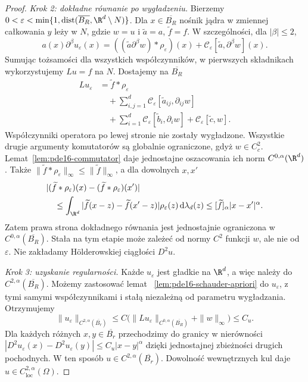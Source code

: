 \begin{proof}
\emph{Krok 2: dokładne równanie po wygładzeniu.}
Bierzemy $0<\varepsilon<\min\{1,
\operatorname{dist}(\overline{B_R},\R^d\setminus N)\}$.
Dla $x\in\overline{B_R}$ nośnik jądra w zmiennej
całkowania $y$ leży w $N$, gdzie $w=u$ i
$\widetilde a=a$, $\widetilde f=f$.
W szczególności, dla $|\beta|\le2$,
\[
 a(x)\partial^\beta u_\varepsilon(x)
 =((\widetilde a\partial^\beta w)*\rho_\varepsilon)(x)
    +\mathcal C_\varepsilon[\widetilde a,\partial^\beta w](x).
\]
Sumując tożsamości dla wszystkich współczynników,
w pierwszych składnikach wykorzystujemy $Lu=f$
na $N$. Dostajemy na $\overline{B_R}$
\[
 \begin{aligned}
 Lu_\varepsilon
 &=\widetilde f*\rho_\varepsilon\\
 &\quad+\sum_{i,j=1}^d
       \mathcal C_\varepsilon[\widetilde a_{ij},\partial_{ij}w]\\
 &\quad+\sum_{i=1}^d
       \mathcal C_\varepsilon[\widetilde b_i,\partial_i w]
       +\mathcal C_\varepsilon[\widetilde c,w].
 \end{aligned}
\]
Współczynniki operatora po lewej stronie
nie zostały wygładzone.
Wszystkie drugie argumenty komutatorów są globalnie
ograniczone, gdyż $w\in C_c^2$.
Lemat~\ref{lem:pde16-commutator} daje jednostajne
oszacowania ich norm $C^{0,\alpha}(\R^d)$.
Także $\|\widetilde f*\rho_\varepsilon\|_\infty
\le\|\widetilde f\|_\infty$, a dla dowolnych $x,x'$
\[
 \begin{aligned}
 &|(\widetilde f*\rho_\varepsilon)(x)
       -(\widetilde f*\rho_\varepsilon)(x')|\\
 &\quad\le\int_{\R^d}
 |\widetilde f(x-z)-\widetilde f(x'-z)|
 \rho_\varepsilon(z)\,\mathrm d\lambda_d(z)
 \le[\widetilde f]_\alpha|x-x'|^\alpha .
 \end{aligned}
\]
Zatem prawa strona dokładnego równania jest
jednostajnie ograniczona w $C^{0,\alpha}(\overline{B_R})$.
Stała na tym etapie może zależeć od normy $C^2$
funkcji $w$, ale nie od $\varepsilon$.
Nie zakładamy Hölderowskiej ciągłości $D^2u$.

\emph{Krok 3: uzyskanie regularności.}
Każde $u_\varepsilon$ jest gładkie na $\R^d$,
a więc należy do $C^{2,\alpha}(\overline{B_R})$.
Możemy zastosować lemat
~\ref{lem:pde16-schauder-apriori} do $u_\varepsilon$,
z tymi samymi współczynnikami i stałą niezależną
od parametru wygładzania. Otrzymujemy
\[
 \|u_\varepsilon\|_{C^{2,\alpha}(\overline{B_r})}
 \le C\bigl(\|Lu_\varepsilon\|_{C^{0,\alpha}(\overline{B_R})}
                  +\|w\|_\infty\bigr)\le C_u.
\]
Dla każdych różnych $x,y\in\overline{B_r}$
przechodzimy do granicy w nierówności
$|D^2u_\varepsilon(x)-D^2u_\varepsilon(y)|
\le C_u|x-y|^\alpha$ dzięki jednostajnej zbieżności
drugich pochodnych. W ten sposób
$u\in C^{2,\alpha}(\overline{B_r})$.
Dowolność wewnętrznych kul daje
$u\in C^{2,\alpha}_{\mathrm{loc}}(\Omega)$.


\end{proof}
